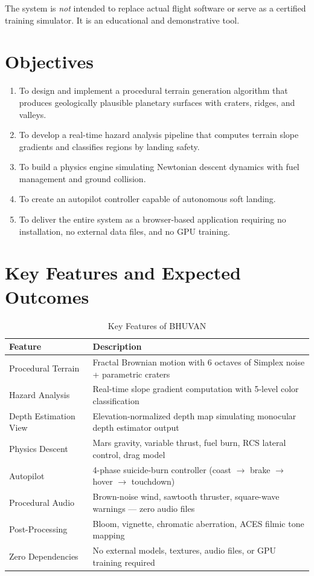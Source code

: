 The system is \textit{not} intended to replace actual flight software or serve as a certified training simulator. It is an educational and demonstrative tool.

\section{Objectives}
\begin{enumerate}
    \item To design and implement a procedural terrain generation algorithm that produces geologically plausible planetary surfaces with craters, ridges, and valleys.
    \item To develop a real-time hazard analysis pipeline that computes terrain slope gradients and classifies regions by landing safety.
    \item To build a physics engine simulating Newtonian descent dynamics with fuel management and ground collision.
    \item To create an autopilot controller capable of autonomous soft landing.
    \item To deliver the entire system as a browser-based application requiring no installation, no external data files, and no GPU training.
\end{enumerate}

\section{Key Features and Expected Outcomes}

\begin{table}[h]
\centering
\caption{Key Features of BHUVAN}
\label{tab:features}
\begin{tabular}{|p{4cm}|p{9cm}|}
\hline
\textbf{Feature} & \textbf{Description} \\
\hline
Procedural Terrain & Fractal Brownian motion with 6 octaves of Simplex noise + parametric craters \\
\hline
Hazard Analysis & Real-time slope gradient computation with 5-level color classification \\
\hline
Depth Estimation View & Elevation-normalized depth map simulating monocular depth estimator output \\
\hline
Physics Descent & Mars gravity, variable thrust, fuel burn, RCS lateral control, drag model \\
\hline
Autopilot & 4-phase suicide-burn controller (coast $\rightarrow$ brake $\rightarrow$ hover $\rightarrow$ touchdown) \\
\hline
Procedural Audio & Brown-noise wind, sawtooth thruster, square-wave warnings --- zero audio files \\
\hline
Post-Processing & Bloom, vignette, chromatic aberration, ACES filmic tone mapping \\
\hline
Zero Dependencies & No external models, textures, audio files, or GPU training required \\
\hline
\end{tabular}
\end{table}


